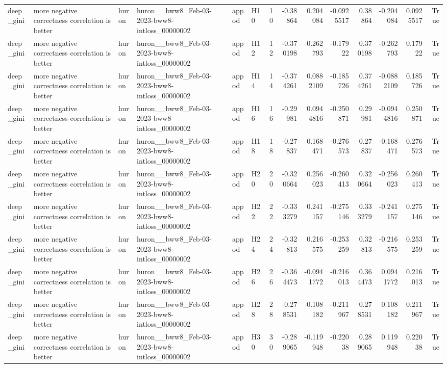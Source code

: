 \begin{longtable}{llllllrrrrrrrr}
deep\_gini & more negative correctness correlation is better & huron & huron\_\_bww8\_Feb-03-2023-bww8-intloss\_00000002 & appod & H10 & 10 & -0.38864 & 0.204084 & -0.0925517 & 0.38864 & -0.204084 & 0.0925517 & True \\
deep\_gini & more negative correctness correlation is better & huron & huron\_\_bww8\_Feb-03-2023-bww8-intloss\_00000002 & appod & H12 & 12 & -0.370198 & 0.262793 & -0.17922 & 0.370198 & -0.262793 & 0.17922 & True \\
deep\_gini & more negative correctness correlation is better & huron & huron\_\_bww8\_Feb-03-2023-bww8-intloss\_00000002 & appod & H14 & 14 & -0.374261 & 0.0882109 & -0.185726 & 0.374261 & -0.0882109 & 0.185726 & True \\
deep\_gini & more negative correctness correlation is better & huron & huron\_\_bww8\_Feb-03-2023-bww8-intloss\_00000002 & appod & H16 & 16 & -0.29981 & 0.0944816 & -0.250871 & 0.29981 & -0.0944816 & 0.250871 & True \\
deep\_gini & more negative correctness correlation is better & huron & huron\_\_bww8\_Feb-03-2023-bww8-intloss\_00000002 & appod & H18 & 18 & -0.27837 & 0.168471 & -0.276573 & 0.27837 & -0.168471 & 0.276573 & True \\
deep\_gini & more negative correctness correlation is better & huron & huron\_\_bww8\_Feb-03-2023-bww8-intloss\_00000002 & appod & H20 & 20 & -0.320664 & 0.256023 & -0.260413 & 0.320664 & -0.256023 & 0.260413 & True \\
deep\_gini & more negative correctness correlation is better & huron & huron\_\_bww8\_Feb-03-2023-bww8-intloss\_00000002 & appod & H22 & 22 & -0.333279 & 0.241157 & -0.275146 & 0.333279 & -0.241157 & 0.275146 & True \\
deep\_gini & more negative correctness correlation is better & huron & huron\_\_bww8\_Feb-03-2023-bww8-intloss\_00000002 & appod & H24 & 24 & -0.32813 & 0.216575 & -0.253259 & 0.32813 & -0.216575 & 0.253259 & True \\
deep\_gini & more negative correctness correlation is better & huron & huron\_\_bww8\_Feb-03-2023-bww8-intloss\_00000002 & appod & H26 & 26 & -0.364473 & -0.0941772 & -0.216013 & 0.364473 & 0.0941772 & 0.216013 & True \\
deep\_gini & more negative correctness correlation is better & huron & huron\_\_bww8\_Feb-03-2023-bww8-intloss\_00000002 & appod & H28 & 28 & -0.278531 & -0.108182 & -0.211967 & 0.278531 & 0.108182 & 0.211967 & True \\
deep\_gini & more negative correctness correlation is better & huron & huron\_\_bww8\_Feb-03-2023-bww8-intloss\_00000002 & appod & H30 & 30 & -0.289065 & -0.119948 & -0.22038 & 0.289065 & 0.119948 & 0.22038 & True \\

\end{longtable}
